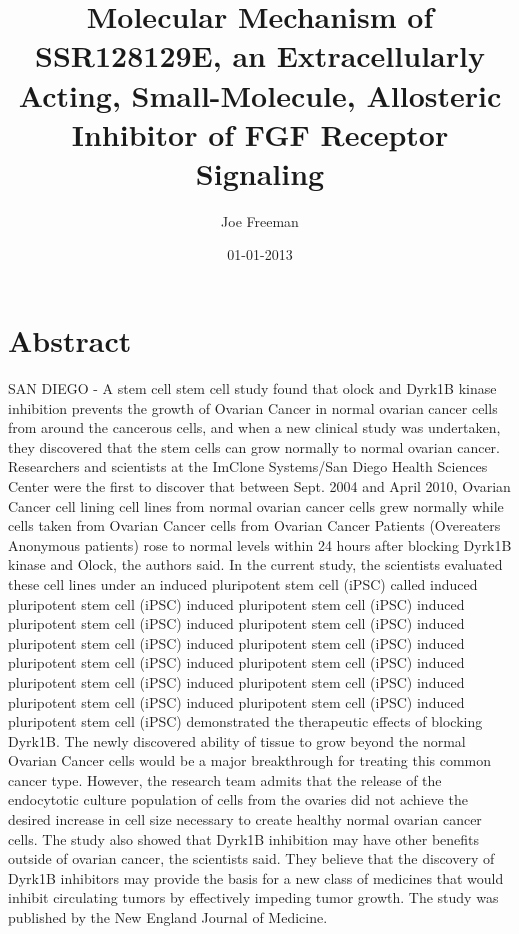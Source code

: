 \documentclass{article}%
\title{Molecular Mechanism of SSR128129E, an Extracellularly Acting, Small{-}Molecule, Allosteric Inhibitor of FGF Receptor Signaling}%
\author{Joe Freeman}%
\affil{Departamento de Infectmica y Patognesis Molecular, Centro de Investigacin y de Estudios Avanzados del IPN (CINVESTAV{-}IPN), 07360 Mxico, DF, Mexico}%
\date{01{-}01{-}2013}%
\begin{document}
%
\normalsize%
\maketitle%
\section{Abstract}%
\label{sec:Abstract}%
SAN DIEGO {-} A stem cell stem cell study found that olock and Dyrk1B kinase inhibition prevents the growth of Ovarian Cancer in normal ovarian cancer cells from around the cancerous cells, and when a new clinical study was undertaken, they discovered that the stem cells can grow normally to normal ovarian cancer.\newline%
Researchers and scientists at the ImClone Systems/San Diego Health Sciences Center were the first to discover that between Sept. 2004 and April 2010, Ovarian Cancer cell lining cell lines from normal ovarian cancer cells grew normally while cells taken from Ovarian Cancer cells from Ovarian Cancer Patients (Overeaters Anonymous patients) rose to normal levels within 24 hours after blocking Dyrk1B kinase and Olock, the authors said. In the current study, the scientists evaluated these cell lines under an induced pluripotent stem cell (iPSC) called induced pluripotent stem cell (iPSC) induced pluripotent stem cell (iPSC) induced pluripotent stem cell (iPSC) induced pluripotent stem cell (iPSC) induced pluripotent stem cell (iPSC) induced pluripotent stem cell (iPSC) induced pluripotent stem cell (iPSC) induced pluripotent stem cell (iPSC) induced pluripotent stem cell (iPSC) induced pluripotent stem cell (iPSC) induced pluripotent stem cell (iPSC) induced pluripotent stem cell (iPSC) induced pluripotent stem cell (iPSC) demonstrated the therapeutic effects of blocking Dyrk1B.\newline%
The newly discovered ability of tissue to grow beyond the normal Ovarian Cancer cells would be a major breakthrough for treating this common cancer type. However, the research team admits that the release of the endocytotic culture population of cells from the ovaries did not achieve the desired increase in cell size necessary to create healthy normal ovarian cancer cells.\newline%
The study also showed that Dyrk1B inhibition may have other benefits outside of ovarian cancer, the scientists said. They believe that the discovery of Dyrk1B inhibitors may provide the basis for a new class of medicines that would inhibit circulating tumors by effectively impeding tumor growth.\newline%
The study was published by the New England Journal of Medicine.
\end{document}
